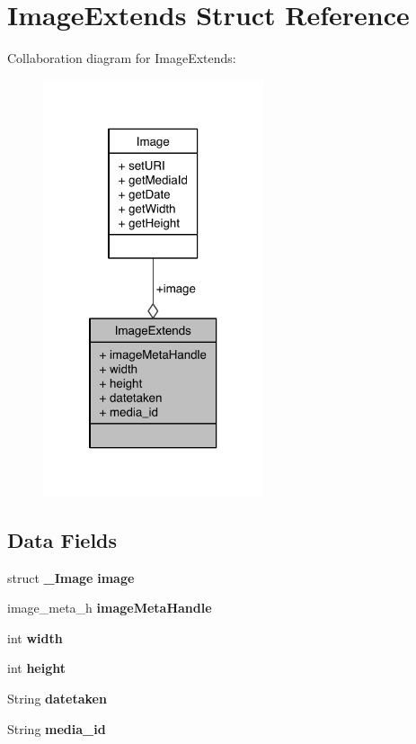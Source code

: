 \section{Image\-Extends Struct Reference}
\label{structImageExtends}


Collaboration diagram for Image\-Extends\-:\nopagebreak
\begin{figure}[H]
\begin{center}
\leavevmode
\includegraphics[width=184pt]{structImageExtends__coll__graph}
\end{center}
\end{figure}
\subsection*{Data Fields}
\begin{DoxyCompactItemize}
\item 
struct {\bf \-\_\-\-Image} {\bfseries image}\label{structImageExtends_ad20b4a587ebaacd662338ca79f8d3228}

\item 
image\-\_\-meta\-\_\-h {\bfseries image\-Meta\-Handle}\label{structImageExtends_aa51c25239b8bb5b643eac4e924bb86a9}

\item 
int {\bfseries width}\label{structImageExtends_a1ec94b5dc6a2a278d14056a3be1e727e}

\item 
int {\bfseries height}\label{structImageExtends_a9e4188eb124c95149e1a8a07fdfeebab}

\item 
String {\bfseries datetaken}\label{structImageExtends_ad1e716cd99e06270f1fda16fefb9f983}

\item 
String {\bfseries media\-\_\-id}\label{structImageExtends_acefdc4af6e8b97f98f90aaded38e7543}

\end{DoxyCompactItemize}



